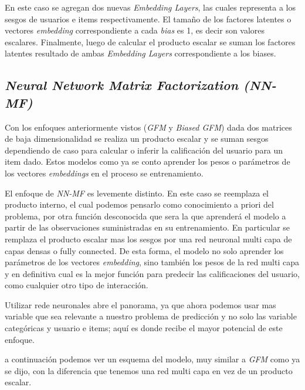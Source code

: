 \documentclass[11pt,a4paper,twoside]{thesis}
\begin{document}
En este caso se agregan dos nuevas \textit{Embedding Layers}, las cuales
representa a los sesgos de usuarios e items respectivamente. El tamaño de los
factores latentes o vectores \textit{embedding} correspondiente a cada
\textit{bias} es 1, es decir son valores escalares. Finalmente, luego de
calcular el producto escalar se suman los factores latentes resultado de ambas
\textit{Embedding Layers} correspondiente a los biases.

\clearpage

\subsection{\textit{Neural Network Matrix Factorization (NN-MF)}}

Con los enfoques anteriormente vistos (\textit{GFM} y \textit{Biased GFM}) dada
dos matrices de baja dimensionalidad se realiza un producto escalar y se suman
sesgos dependiendo de caso para calcular o inferir la calificación del usuario
para un item dado. Estos modelos como ya se conto aprender los pesos o
parámetros de los vectores \textit{embeddings} en el proceso se entrenamiento.

El enfoque de {\textit{NN-MF}} \cite{nnfm} \cite{ncf} es levemente distinto. En
este caso se reemplaza el producto interno, el cual podemos pensarlo como
conocimiento a priori del problema, por otra función desconocida que sera la
que aprenderá el modelo a partir de las observaciones suministradas en su
entrenamiento. En particular se remplaza el producto escalar mas los sesgos por
una red neuronal multi capa de capas densas o fully connected. De esta forma,
el modelo no solo aprender los parámetros de los vectores \textit{embedding},
sino también los pesos de la red multi capa y en definitiva cual es la mejor
función para predecir las calificaciones del usuario, como cualquier otro tipo
de interacción.

Utilizar rede neuronales abre el panorama, ya que ahora podemos usar mas
variable que sea relevante a nuestro problema de predicción y no solo las
variable categóricas y usuario e items; aquí es donde recibe el mayor potencial
de este enfoque.

a continuación podemos ver un esquema del modelo, muy similar a \textit{GFM}
como ya se dijo, con la diferencia que tenemos una red multi capa en vez de un
producto escalar.
\end{document}
